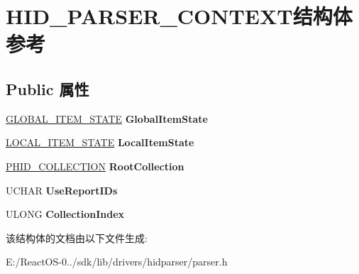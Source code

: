 \hypertarget{struct_h_i_d___p_a_r_s_e_r___c_o_n_t_e_x_t}{}\section{H\+I\+D\+\_\+\+P\+A\+R\+S\+E\+R\+\_\+\+C\+O\+N\+T\+E\+X\+T结构体 参考}
\label{struct_h_i_d___p_a_r_s_e_r___c_o_n_t_e_x_t}
\subsection*{Public 属性}
\begin{DoxyCompactItemize}
\item 
\mbox{\label{struct_h_i_d___p_a_r_s_e_r___c_o_n_t_e_x_t_ad3bf4e691bc05fcf6bf7dc6e05bfc78c}} 
\hyperlink{struct_____g_l_o_b_a_l___i_t_e_m___s_t_a_t_e__}{G\+L\+O\+B\+A\+L\+\_\+\+I\+T\+E\+M\+\_\+\+S\+T\+A\+TE} {\bfseries Global\+Item\+State}
\item 
\mbox{\label{struct_h_i_d___p_a_r_s_e_r___c_o_n_t_e_x_t_a6bdf88ac0451d6b6cedc2fd252141b7b}} 
\hyperlink{struct_l_o_c_a_l___i_t_e_m___s_t_a_t_e}{L\+O\+C\+A\+L\+\_\+\+I\+T\+E\+M\+\_\+\+S\+T\+A\+TE} {\bfseries Local\+Item\+State}
\item 
\mbox{\label{struct_h_i_d___p_a_r_s_e_r___c_o_n_t_e_x_t_aea2090a2c19d5df15f5ff9242dedf8dc}} 
\hyperlink{struct_____h_i_d___c_o_l_l_e_c_t_i_o_n____}{P\+H\+I\+D\+\_\+\+C\+O\+L\+L\+E\+C\+T\+I\+ON} {\bfseries Root\+Collection}
\item 
\mbox{\label{struct_h_i_d___p_a_r_s_e_r___c_o_n_t_e_x_t_af6c787b872df7dd2a13cc609de0cd49d}} 
U\+C\+H\+AR {\bfseries Use\+Report\+I\+Ds}
\item 
\mbox{\label{struct_h_i_d___p_a_r_s_e_r___c_o_n_t_e_x_t_ac1c1825eeb9c23d5803ac1861c93e58f}} 
U\+L\+O\+NG {\bfseries Collection\+Index}
\end{DoxyCompactItemize}


该结构体的文档由以下文件生成\+:\begin{DoxyCompactItemize}
\item 
E\+:/\+React\+O\+S-\/0../sdk/lib/drivers/hidparser/parser.\+h\end{DoxyCompactItemize}

